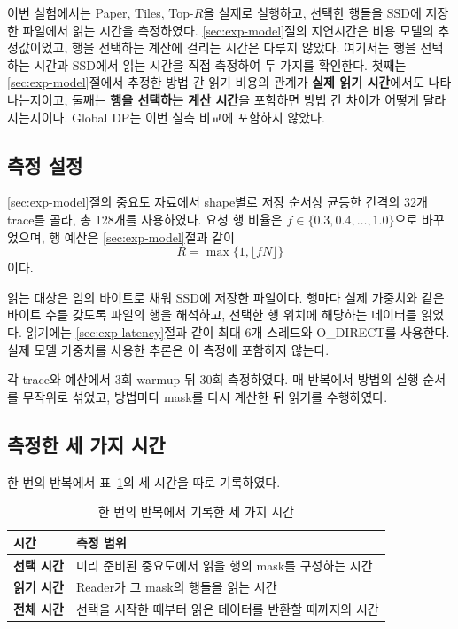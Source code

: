 이번 실험에서는 Paper, Tiles, Top-$R$을 실제로 실행하고, 선택한 행들을 SSD에 저장한 파일에서 읽는 시간을 측정하였다. \ref{sec:exp-model}절의 지연시간은 비용 모델의 추정값이었고, 행을 선택하는 계산에 걸리는 시간은 다루지 않았다. 여기서는 행을 선택하는 시간과 SSD에서 읽는 시간을 직접 측정하여 두 가지를 확인한다. 첫째는 \ref{sec:exp-model}절에서 추정한 방법 간 읽기 비용의 관계가 \textbf{실제 읽기 시간}에서도 나타나는지이고, 둘째는 \textbf{행을 선택하는 계산 시간}을 포함하면 방법 간 차이가 어떻게 달라지는지이다. Global DP는 이번 실측 비교에 포함하지 않았다.

\subsection{측정 설정}\label{sec:exp-real-setup}

\ref{sec:exp-model}절의 중요도 자료에서 shape별로 저장 순서상 균등한 간격의 32개 trace를 골라, 총 128개를 사용하였다. 요청 행 비율은 $f\in\{0.3,0.4,\ldots,1.0\}$으로 바꾸었으며, 행 예산은 \ref{sec:exp-model}절과 같이
\[
R=\max\{1,\lfloor fN\rfloor\}
\]
이다.

읽는 대상은 임의 바이트로 채워 SSD에 저장한 파일이다. 행마다 실제 가중치와 같은 바이트 수를 갖도록 파일의 행을 해석하고, 선택한 행 위치에 해당하는 데이터를 읽었다. 읽기에는 \ref{sec:exp-latency}절과 같이 최대 6개 스레드와 O\_DIRECT를 사용한다. 실제 모델 가중치를 사용한 추론은 이 측정에 포함하지 않는다.

각 trace와 예산에서 3회 warmup 뒤 30회 측정하였다. 매 반복에서 방법의 실행 순서를 무작위로 섞었고, 방법마다 mask를 다시 계산한 뒤 읽기를 수행하였다.

\subsection{측정한 세 가지 시간}\label{sec:exp-real-times}

한 번의 반복에서 표~\ref{tab:real-times}의 세 시간을 따로 기록하였다.

\begin{table}[htbp]
    \centering
    \caption{한 번의 반복에서 기록한 세 가지 시간}
    \label{tab:real-times}
    \begin{tabular}{ll}
        \toprule
        시간 & 측정 범위 \\
        \midrule
        \textbf{선택 시간} & 미리 준비된 중요도에서 읽을 행의 mask를 구성하는 시간 \\
        \textbf{읽기 시간} & Reader가 그 mask의 행들을 읽는 시간 \\
        \textbf{전체 시간} & 선택을 시작한 때부터 읽은 데이터를 반환할 때까지의 시간 \\
        \bottomrule
    \end{tabular}
\end{table}

